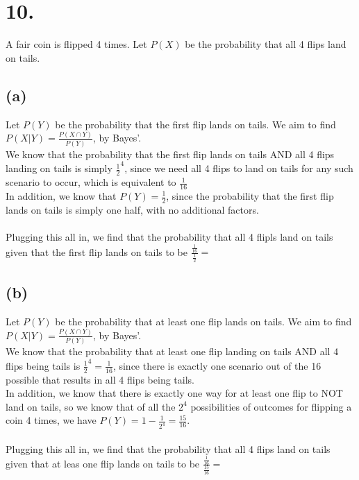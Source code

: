 \documentclass{article}
\begin{document}
\section*{10.}
{\Large 
A fair coin is flipped 4 times. Let $P(X)$ be the probability that all 4 flips land on tails.

\subsection*{(a)}
Let $P(Y)$ be the probability that the first flip lands on tails. We aim to find $P(X|Y) = \frac{P(X \cap Y)}{P(Y)}$, by Bayes'. \\
We know that the probability that the first flip lands on tails AND all 4 flips landing on tails is simply $\frac{1}{2}^4$, since we need all 4 flips to land on tails for any such scenario to occur, which is equivalent to $\frac{1}{16}$ \\
In addition, we know that $P(Y) = \frac{1}{2}$, since the probability that the first flip lands on tails is simply one half, with no additional factors. \\ \\ 
Plugging this all in, we find that the probability that all 4 flipls land on tails given that the first flip lands on tails to be $\frac{\frac{1}{16}}{\frac{1}{2}} = $ 

\subsection*{(b)}
Let $P(Y)$ be the probability that at least one flip lands on tails. We aim to find $P(X|Y) = \frac{P(X \cap Y)}{P(Y)}$, by Bayes'. \\
We know that the probability that at least one flip landing on tails AND all 4 flips being tails is $\frac{1}{2}^4 = \frac{1}{16}$, since there is exactly one scenario out of the 16 possible that results in all 4 flips being tails. \\
In addition, we know that there is exactly one way for at least one flip to NOT land on tails, so we know that of all the $2^4$ possibilities of outcomes for flipping a coin 4 times, we have $P(Y) = 1 - \frac{1}{2^4} = \frac{15}{16}$. \\ \\
Plugging this all in, we find that the probability that all 4 flips land on tails given that at leas one flip lands on tails to be $\frac{\frac{1}{16}}{\frac{15}{16}} = $ 


}
\end{document}

